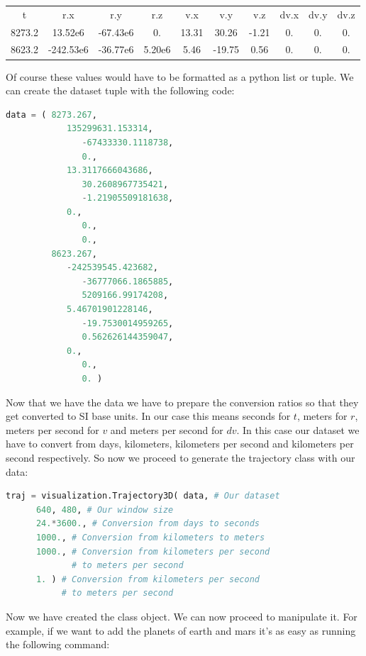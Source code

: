 \documentclass[a4paper,11pt]{article}
\begin{document}
\begin{tabular}{|c|c|c|c|c|c|c|c|c|c|}
   t & r.x & r.y & r.z & v.x & v.y & v.z & dv.x & dv.y & dv.z \\
   8273.2 & 13.52e6 & -67.43e6 & 0. & 13.31 & 30.26 & -1.21 & 0. & 0. & 0. \\
   8623.2 & -242.53e6 & -36.77e6 & 5.20e6 & 5.46 & -19.75 & 0.56 & 0. & 0. & 0. \\
\end{tabular}

Of course these values would have to be formatted as a python list or tuple. We can create the dataset tuple with the following code:

\begin{lstlisting}[language=Python,breakatwhitespace=true]
data = ( 8273.267,
            135299631.153314,
               -67433330.1118738,
               0.,
            13.3117666043686,
               30.2608967735421,
               -1.21905509181638,
            0.,
               0.,
               0.,
         8623.267,
            -242539545.423682,
               -36777066.1865885,
               5209166.99174208,
            5.46701901228146,
               -19.7530014959265,
               0.562626144359047,
            0.,
               0.,
               0. )
\end{lstlisting}

Now that we have the data we have to prepare the conversion ratios so that they get converted to \gls{SI}\cite{siunits} base units. In our case this means seconds for $t$, meters for $r$, meters per second for $v$ and meters per second for $dv$. In this case our dataset we have to convert from days, kilometers, kilometers per second and kilometers per second respectively. So now we proceed to generate the trajectory class with our data:

\begin{lstlisting}[language=Python,breakatwhitespace=true]
traj = visualization.Trajectory3D( data, # Our dataset
      640, 480, # Our window size
      24.*3600., # Conversion from days to seconds
      1000., # Conversion from kilometers to meters
      1000., # Conversion from kilometers per second
             # to meters per second
      1. ) # Conversion from kilometers per second
           # to meters per second
\end{lstlisting}

Now we have created the class object. We can now proceed to manipulate it. For example, if we want to add the planets of earth and mars it's as easy as running the following command:
\end{document}
